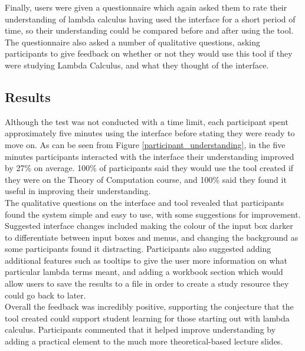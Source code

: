 \documentclass[a4paper,11pt]{report}
\begin{document}
Finally, users were given a questionnaire which again asked them to rate their understanding of lambda calculus having used the interface for a short period of time, so their understanding could be compared before and after using the tool. The questionnaire also asked a number of qualitative questions, asking participants to give feedback on whether or not they would use this tool if they were studying Lambda Calculus, and what they thought of the interface.

\subsection{Results}
Although the test was not conducted with a time limit, each participant spent approximately five minutes using the interface before stating they were ready to move on. As can be seen from Figure \ref{participant_understanding}, in the five minutes participants interacted with the interface their understanding improved by 27\% on average. 100\% of participants said they would use the tool created if they were on the Theory of Computation course, and 100\% said they found it useful in improving their understanding.\\

The qualitative questions on the interface and tool revealed that participants found the system simple and easy to use, with some suggestions for improvement. Suggested interface changes included making the colour of the input box darker to differentiate between input boxes and menus, and changing the background as some participants found it distracting. Participants also suggested adding additional features such as tooltips to give the user more information on what particular lambda terms meant, and adding a workbook section which would allow users to save the results to a file in order to create a study resource they could go back to later.\\

Overall the feedback was incredibly positive, supporting the conjecture that the tool created could support student learning for those starting out with lambda calculus. Participants commented that it helped improve understanding by adding a practical element to the much more theoretical-based lecture slides.

\end{document}
